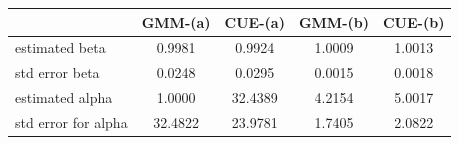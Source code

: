 \begin{tabular}{lcccc}
  \hline
 & GMM-(a) & CUE-(a) & GMM-(b) & CUE-(b) \\ 
  \hline
estimated beta & 0.9981 & 0.9924 & 1.0009 & 1.0013 \\ 
  std error beta & 0.0248 & 0.0295 & 0.0015 & 0.0018 \\ 
  estimated alpha & 1.0000 & 32.4389 & 4.2154 & 5.0017 \\ 
  std error for alpha & 32.4822 & 23.9781 & 1.7405 & 2.0822 \\ 
   \hline
\end{tabular}
